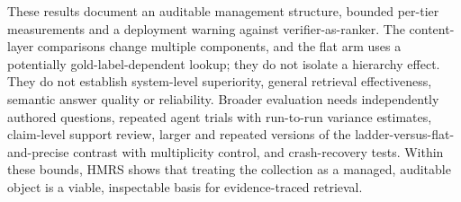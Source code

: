 These results document an auditable management structure, bounded per-tier
measurements and a deployment warning against verifier-as-ranker. The
content-layer comparisons change multiple components, and the flat arm uses a
potentially gold-label-dependent lookup; they do not isolate a hierarchy effect. They
do not establish system-level superiority, general retrieval effectiveness,
semantic answer quality or reliability. Broader evaluation needs independently
authored questions, repeated agent trials with run-to-run variance estimates,
claim-level support review, larger and repeated versions of the
ladder-versus-flat-and-precise contrast with multiplicity control, and
crash-recovery tests. Within these bounds, HMRS shows that treating the
collection as a managed, auditable object is a viable, inspectable basis for
evidence-traced retrieval.
